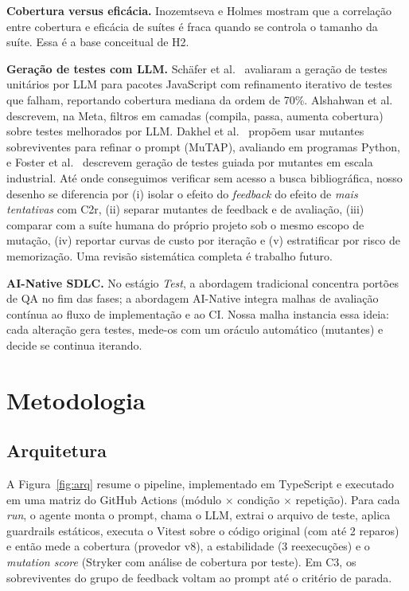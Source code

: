 \documentclass[12pt]{article}
\begin{document}
\textbf{Cobertura versus eficácia.} Inozemtseva e Holmes \cite{inozemtseva2014} mostram que a correlação entre
cobertura e eficácia de suítes é fraca quando se controla o tamanho da suíte. Essa é a base conceitual de H2.

\textbf{Geração de testes com LLM.} Schäfer et al.\ \cite{schafer2024} avaliaram a geração de testes unitários por LLM
para pacotes JavaScript com refinamento iterativo de testes que falham, reportando cobertura mediana da ordem de 70\%.
Alshahwan et al.\ \cite{alshahwan2024} descrevem, na Meta, filtros em camadas (compila, passa, aumenta cobertura) sobre
testes melhorados por LLM. Dakhel et al.\ \cite{dakhel2024} propõem usar mutantes sobreviventes para refinar o prompt
(MuTAP), avaliando em programas Python, e Foster et al.\ \cite{foster2025} descrevem geração de testes guiada por
mutantes em escala industrial. Até onde conseguimos verificar sem acesso a busca bibliográfica, nosso desenho se
diferencia por (i) isolar o efeito do \emph{feedback} do efeito de \emph{mais tentativas} com C2r, (ii) separar mutantes de
feedback e de avaliação, (iii) comparar com a suíte humana do próprio projeto sob o mesmo escopo de mutação, (iv) reportar
curvas de custo por iteração e (v) estratificar por risco de memorização. Uma revisão sistemática completa é trabalho futuro.

\textbf{AI-Native SDLC.} No estágio \textit{Test}, a abordagem tradicional concentra portões de QA no fim das fases; a
abordagem AI-Native integra malhas de avaliação contínua ao fluxo de implementação e ao CI. Nossa malha instancia essa
ideia: cada alteração gera testes, mede-os com um oráculo automático (mutantes) e decide se continua iterando.

\section{Metodologia}

\subsection{Arquitetura}

A Figura~\ref{fig:arq} resume o pipeline, implementado em TypeScript e executado em uma matriz do GitHub Actions
(módulo $\times$ condição $\times$ repetição). Para cada \textit{run}, o agente monta o prompt, chama o LLM, extrai o arquivo
de teste, aplica guardrails estáticos, executa o Vitest sobre o código original (com até 2 reparos) e então mede a
cobertura (provedor v8), a estabilidade (3 reexecuções) e o \textit{mutation score} (Stryker com análise de cobertura por
teste). Em C3, os sobreviventes do grupo de feedback voltam ao prompt até o critério de parada.
\end{document}
